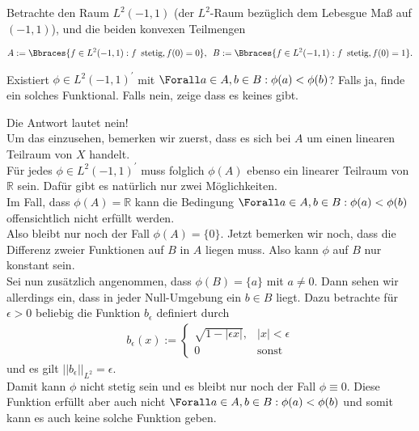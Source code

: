 \begin{exercise}

Betrachte den Raum $L^2(-1, 1)$ (der $L^2$-Raum bezüglich dem Lebesgue Maß auf $(-1, 1)$), und die beiden konvexen Teilmengen

\begin{align*}
  A := \Bbraces{f \in L^2(-1, 1): f \enspace \text{stetig}, f(0) = 0},
  \enspace
  B := \Bbraces{f \in L^2(-1, 1): f \enspace \text{stetig}, f(0) = 1}.
\end{align*}

Existiert $\phi \in L^2(-1, 1)^\prime$ mit $\Forall a \in A, b \in B: \phi(a) < \phi(b)$?
Falls ja, finde ein solches Funktional.
Falls nein, zeige dass es keines gibt.

\end{exercise}

\begin{solution}

Die Antwort lautet nein! \\
Um das einzusehen, bemerken wir zuerst, dass es sich bei $A$ um einen linearen
Teilraum von $X$ handelt. \\
Für jedes $\phi \in L^2(-1, 1)^\prime$ muss folglich
$\phi(A)$ ebenso ein linearer Teilraum von $\mathbb{R}$ sein.
Dafür gibt es natürlich nur zwei Möglichkeiten. \\
Im Fall, dass $\phi(A) = \mathbb{R}$ kann die Bedingung $\Forall a \in A, b \in B: \phi(a) < \phi(b)$
offensichtlich nicht erfüllt werden. \\
Also bleibt nur noch der Fall $\phi(A) = \{0\}$.
Jetzt bemerken wir noch, dass die Differenz zweier Funktionen auf $B$ in $A$ liegen
muss. Also kann $\phi$ auf $B$ nur konstant sein. \\
Sei nun zusätzlich angenommen, dass $\phi(B) = \{a\}$ mit $a \neq 0$.
Dann sehen wir allerdings ein, dass in jeder Null-Umgebung ein $b \in B$ liegt.
Dazu betrachte für $\epsilon > 0$ beliebig die Funktion $b_{\epsilon}$ definiert durch
\begin{align*}
  b_{\epsilon}(x) := \begin{cases}
    \sqrt{1 - |\epsilon x|}, & |x| < \epsilon \\
    0 & \text{sonst}
  \end{cases}
\end{align*}
und es gilt $||b_{\epsilon}||_{L^2} = \epsilon$. \\
Damit kann $\phi$ nicht stetig sein und es bleibt nur noch der Fall $\phi \equiv 0$.
Diese Funktion erfüllt aber auch nicht $\Forall a \in A, b \in B: \phi(a) < \phi(b)$
und somit kann es auch keine solche Funktion geben.
\end{solution}
